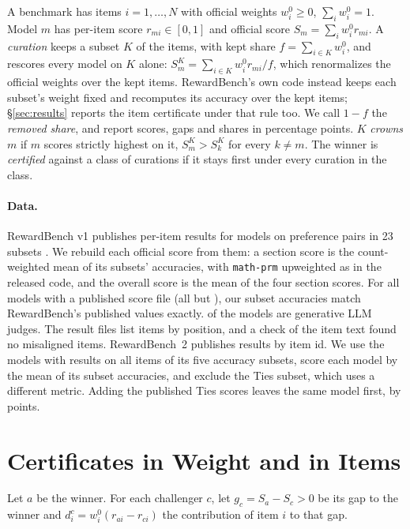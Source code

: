 \documentclass[11pt]{article}
\begin{document}
A benchmark has items $i=1,\dots,N$ with official weights $w^0_i\ge 0$, $\sum_i w^0_i=1$. Model $m$ has per-item score $r_{mi}\in[0,1]$ and official score $S_m=\sum_i w^0_i r_{mi}$. A \emph{curation} keeps a subset $K$ of the items, with kept share $f=\sum_{i\in K}w^0_i$, and rescores every model on $K$ alone: $S^K_m=\sum_{i\in K}w^0_i r_{mi}/f$, which renormalizes the official weights over the kept items. RewardBench's own code instead keeps each subset's weight fixed and recomputes its accuracy over the kept items; \S\ref{sec:results} reports the item certificate under that rule too. We call $1-f$ the \emph{removed share}, and report scores, gaps and shares in percentage points. $K$ \emph{crowns} $m$ if $m$ scores strictly highest on it, $S^K_m>S^K_k$ for every $k\neq m$. The winner is \emph{certified} against a class of curations if it stays first under every curation in the class.

\paragraph{Data.} RewardBench v1 publishes per-item results for \OneModels{} models on \OneItems{} preference pairs in 23 subsets \citep{lambert2024rewardbench}. We rebuild each official score from them: a section score is the count-weighted mean of its subsets' accuracies, with \texttt{math-prm} upweighted as in the released code, and the overall score is the mean of the four section scores. For all \OneChecked{} models with a published score file (all but \OneUnpublished{}), our subset accuracies match RewardBench's published values exactly. \OneJudges{} of the \OneModels{} models are generative LLM judges. The result files list items by position, and a check of the item text found no misaligned items. RewardBench~2 \citep{malik2025rewardbench2} publishes results by item id. We use the \TwoModels{} models with results on all \TwoItems{} items of its five accuracy subsets, score each model by the mean of its subset accuracies, and exclude the Ties subset, which uses a different metric. Adding the published Ties scores leaves the same model first, by \TwoTiesLead{} points.

\section{Certificates in Weight and in Items}\label{sec:cert}

Let $a$ be the winner. For each challenger $c$, let $g_c=S_a-S_c>0$ be its gap to the winner and $d^c_i=w^0_i(r_{ai}-r_{ci})$ the contribution of item $i$ to that gap.
\end{document}
